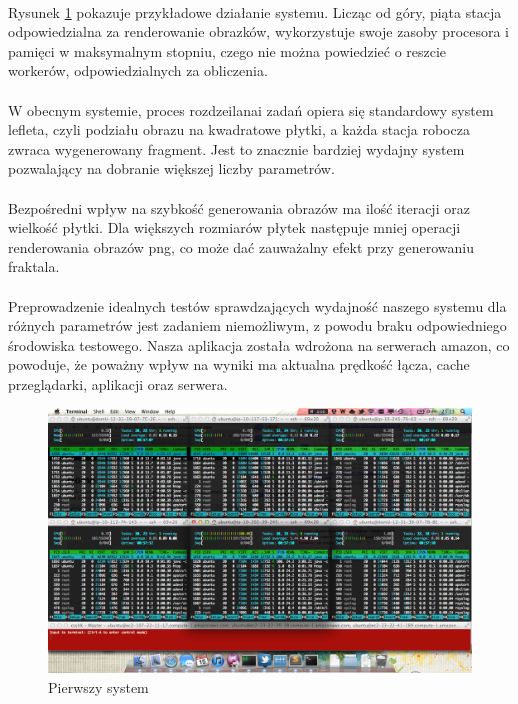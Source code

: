 \documentclass[wide,a4paper,titlepage,12pt]{article}
\begin{document}
\paragraph{}
Rysunek \ref{fig:amazon} pokazuje przykładowe działanie systemu. Licząc od góry, piąta stacja odpowiedzialna 
za renderowanie obrazków, wykorzystuje swoje zasoby procesora i pamięci w maksymalnym stopniu, czego nie można 
powiedzieć o reszcie workerów, odpowiedzialnych za obliczenia.

\paragraph{}
W obecnym systemie, proces rozdzeilanai zadań opiera się standardowy system lefleta, czyli podziału obrazu na kwadratowe
płytki, a każda stacja robocza zwraca wygenerowany fragment. Jest to znacznie bardziej wydajny system pozwalający na dobranie
większej liczby parametrów.

\paragraph{}
Bezpośredni wpływ na szybkość generowania obrazów ma ilość iteracji oraz wielkość płytki. Dla większych rozmiarów płytek 
następuje mniej operacji renderowania obrazów png, co może dać zauważalny efekt przy generowaniu fraktala. 

\paragraph{}
Preprowadzenie idealnych testów sprawdzających wydajność naszego systemu dla różnych parametrów jest zadaniem niemożliwym, 
z powodu braku odpowiedniego środowiska testowego. Nasza aplikacja została wdrożona na serwerach amazon, co powoduje, 
że poważny wpływ na wyniki ma aktualna prędkość łącza, cache przeglądarki, aplikacji oraz serwera.

\begin{figure}[h!]
\begin{center}
\includegraphics[scale=0.33]{amazon.png}
\end{center}
\caption{Pierwszy system}
\label{fig:amazon}
\end{figure}
\end{document}
